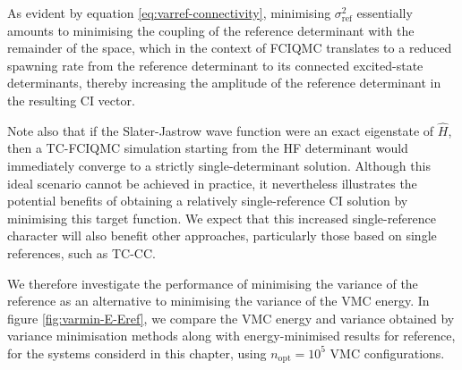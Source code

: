 As evident by equation \ref{eq:varref-connectivity}, minimising $\sigma_\mathrm{ref}^2$ essentially amounts to minimising the coupling of the reference determinant with the remainder of the space, which in the context of FCIQMC translates to a reduced spawning rate from the reference determinant to its connected excited-state determinants, thereby increasing the amplitude of the reference determinant in the resulting CI vector.

Note also that if the Slater-Jastrow wave function were an exact eigenstate of $\hat H$, then a TC-FCIQMC simulation starting from the HF determinant would immediately converge to a strictly single-determinant solution. Although this ideal scenario cannot be achieved in practice, it nevertheless illustrates the potential benefits of obtaining a relatively single-reference CI solution by minimising this target function. We expect that this increased single-reference character will also benefit other approaches, particularly those based on single references, such as TC-CC.

We therefore investigate the performance of minimising the variance of the reference as an alternative to minimising the variance of the VMC energy. In figure \ref{fig:varmin-E-Eref}, we compare the VMC energy and variance obtained by variance minimisation methods along with energy-minimised  results for reference, for the systems considerd in this chapter, using $n_\mathrm{opt}=10^5$ VMC configurations.

